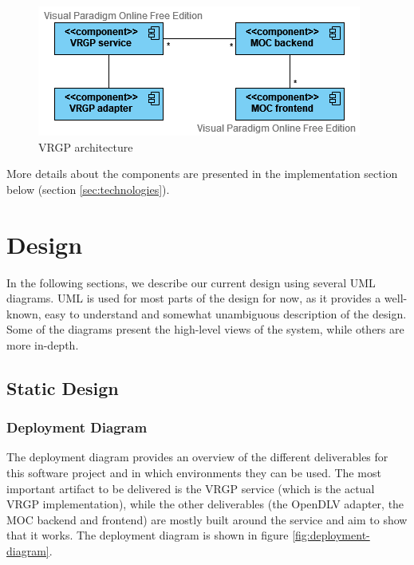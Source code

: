 \begin{figure}[ht]
	\centering
	\includegraphics[width=\linewidth]{images/vrgp-architecture}
	\caption{VRGP architecture}
	\label{fig:vrgp-architecture}
\end{figure}

More details about the components are presented in the implementation section below (section \ref{sec:technologies}).

\section{Design}\label{sec:design}

In the following sections, we describe our current design using several UML diagrams. UML is used for most parts of the design for now, as it provides a well-known, easy to understand and somewhat unambiguous description of the design. Some of the diagrams present the high-level views of the system, while others are more in-depth.

\subsection{Static Design}

\subsubsection{Deployment Diagram}

The deployment diagram provides an overview of the different deliverables for this software project and in which environments they can be used. The most important artifact to be delivered is the VRGP service (which is the actual VRGP implementation), while the other deliverables (the OpenDLV adapter, the MOC backend and frontend) are mostly built around the service and aim to show that it works. The deployment diagram is shown in figure \ref{fig:deployment-diagram}.

